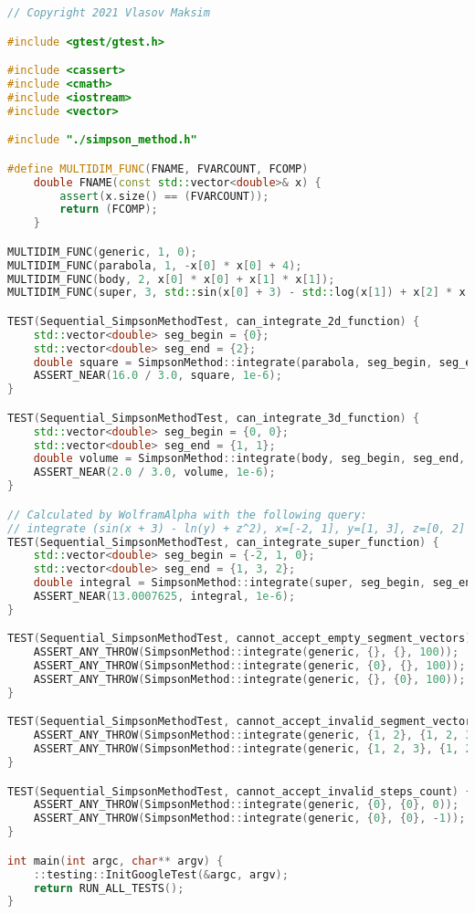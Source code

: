 \documentclass{report}
\begin{document}
\begin{lstlisting}[language=C++]
// Copyright 2021 Vlasov Maksim

#include <gtest/gtest.h>

#include <cassert>
#include <cmath>
#include <iostream>
#include <vector>

#include "./simpson_method.h"

#define MULTIDIM_FUNC(FNAME, FVARCOUNT, FCOMP)                                 \
    double FNAME(const std::vector<double>& x) {                               \
        assert(x.size() == (FVARCOUNT));                                       \
        return (FCOMP);                                                        \
    }

MULTIDIM_FUNC(generic, 1, 0);
MULTIDIM_FUNC(parabola, 1, -x[0] * x[0] + 4);
MULTIDIM_FUNC(body, 2, x[0] * x[0] + x[1] * x[1]);
MULTIDIM_FUNC(super, 3, std::sin(x[0] + 3) - std::log(x[1]) + x[2] * x[2]);

TEST(Sequential_SimpsonMethodTest, can_integrate_2d_function) {
    std::vector<double> seg_begin = {0};
    std::vector<double> seg_end = {2};
    double square = SimpsonMethod::integrate(parabola, seg_begin, seg_end, 100);
    ASSERT_NEAR(16.0 / 3.0, square, 1e-6);
}

TEST(Sequential_SimpsonMethodTest, can_integrate_3d_function) {
    std::vector<double> seg_begin = {0, 0};
    std::vector<double> seg_end = {1, 1};
    double volume = SimpsonMethod::integrate(body, seg_begin, seg_end, 100);
    ASSERT_NEAR(2.0 / 3.0, volume, 1e-6);
}

// Calculated by WolframAlpha with the following query:
// integrate (sin(x + 3) - ln(y) + z^2), x=[-2, 1], y=[1, 3], z=[0, 2]
TEST(Sequential_SimpsonMethodTest, can_integrate_super_function) {
    std::vector<double> seg_begin = {-2, 1, 0};
    std::vector<double> seg_end = {1, 3, 2};
    double integral = SimpsonMethod::integrate(super, seg_begin, seg_end, 100);
    ASSERT_NEAR(13.0007625, integral, 1e-6);
}

TEST(Sequential_SimpsonMethodTest, cannot_accept_empty_segment_vectors) {
    ASSERT_ANY_THROW(SimpsonMethod::integrate(generic, {}, {}, 100));
    ASSERT_ANY_THROW(SimpsonMethod::integrate(generic, {0}, {}, 100));
    ASSERT_ANY_THROW(SimpsonMethod::integrate(generic, {}, {0}, 100));
}

TEST(Sequential_SimpsonMethodTest, cannot_accept_invalid_segment_vectors) {
    ASSERT_ANY_THROW(SimpsonMethod::integrate(generic, {1, 2}, {1, 2, 3}, 100));
    ASSERT_ANY_THROW(SimpsonMethod::integrate(generic, {1, 2, 3}, {1, 2}, 100));
}

TEST(Sequential_SimpsonMethodTest, cannot_accept_invalid_steps_count) {
    ASSERT_ANY_THROW(SimpsonMethod::integrate(generic, {0}, {0}, 0));
    ASSERT_ANY_THROW(SimpsonMethod::integrate(generic, {0}, {0}, -1));
}

int main(int argc, char** argv) {
    ::testing::InitGoogleTest(&argc, argv);
    return RUN_ALL_TESTS();
}
\end{lstlisting}
\end{document}

